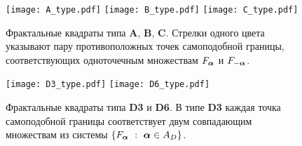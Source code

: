 \begin{figure}[H]
\centering
\texttt{[image: A\_type.pdf]}
\hfill
\texttt{[image: B\_type.pdf]}
\hfill
\texttt{[image: C\_type.pdf]}
\caption{Фрактальные квадраты типа {\bf A}, {\bf B}, {\bf C}. Стрелки одного цвета указывают пару противоположных точек самоподобной границы, соответствующих одноточечным множествам $F_{\bm{\alpha}}$ и $F_{-{\bm{\alpha}}}$. }
\end{figure}

\begin{figure}[H]
\texttt{[image: D3\_type.pdf]}
\hfill
\texttt{[image: D6\_type.pdf]}
\hfill
\caption{Фрактальные квадраты типа  {\bf D3} и {\bf D6}.  В типе {\bf D3} каждая точка самоподобной границы соответствует двум совпадающим множествам из системы $\{F_{\bm{\alpha}}\ :\ {\bm{\alpha}}\in A_D\}$.}
\end{figure}

